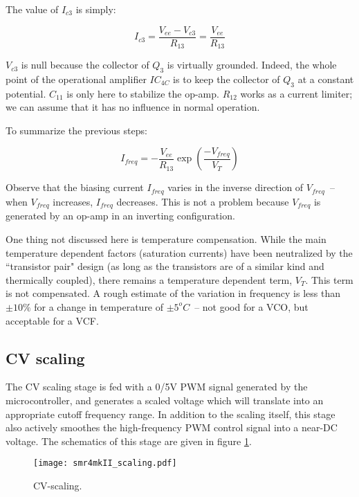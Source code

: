 \documentclass[a4paper,11pt]{article}
\begin{document}
The value of $I_{c3}$ is simply:

\begin{equation}
I_{c3} = \frac{V_{ee} - V_{c3}}{R_{13}} = \frac{V_{ee}}{R_{13}}
\end{equation}

$V_{c3}$ is null because the collector of $Q_3$ is virtually grounded. Indeed, the whole point of the operational amplifier $IC_{4C}$ is to keep the collector of $Q_3$ at a constant potential. $C_{11}$ is only here to stabilize the op-amp. $R_{12}$ works as a current limiter; we can assume that it has no influence in normal operation.

To summarize the previous steps:

\begin{equation}
I_{freq} = -\frac{V_{ee}}{R_{13}} \exp \left(\frac{-V_{freq}}{V_T} \right)
\end{equation}

Observe that the biasing current $I_{freq}$ varies in the inverse direction of $V_{freq}$~-- when $V_{freq}$ increases, $I_{freq}$ decreases. This is not a problem because $V_{freq}$ is generated by an op-amp in an inverting configuration.

One thing not discussed here is temperature compensation. While the main temperature dependent factors (saturation currents) have been neutralized by the ``transistor pair" design (as long as the transistors are of a similar kind and thermically coupled), there remains a temperature dependent term, $V_T$. This term is not compensated. A rough estimate of the variation in frequency is less than $\pm 10\%$ for a change in temperature of $\pm 5^oC$~-- not good for a VCO, but acceptable for a VCF.

\subsection{CV scaling}

The CV scaling stage is fed with a 0/5V PWM signal generated by the microcontroller, and generates a scaled voltage which will translate into an appropriate cutoff frequency range. In addition to the scaling itself, this stage also actively smoothes the high-frequency PWM control signal into a near-DC voltage. The schematics of this stage are given in figure \ref{fig:cvscale}.

\begin{figure}
\centering
\texttt{[image: smr4mkII\_scaling.pdf]}
\caption{CV-scaling.}
\label{fig:cvscale}
\end{figure}
\end{document}
